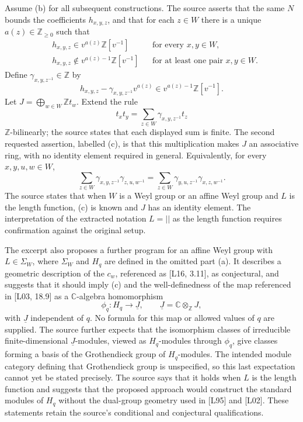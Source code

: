\documentclass[11pt]{article}
\begin{document}
Assume (b) for all subsequent constructions. The source asserts that the same \(N\) bounds the coefficients \(h_{x,y,z}\), and that for each \(z\in W\) there is a unique \(a(z)\in\mathbb Z_{\geq0}\) such that
\[
\begin{aligned}
&h_{x,y,z}\in v^{a(z)}\mathbb Z[v^{-1}]
&&\text{for every }x,y\in W,\\
&h_{x,y,z}\notin v^{a(z)-1}\mathbb Z[v^{-1}]
&&\text{for at least one pair }x,y\in W.
\end{aligned}
\]
Define \(\gamma_{x,y,z^{-1}}\in\mathbb Z\) by
\[
h_{x,y,z}-\gamma_{x,y,z^{-1}}v^{a(z)}
\in v^{a(z)-1}\mathbb Z[v^{-1}].
\]
Let \(J=\bigoplus_{w\in W}\mathbb Zt_w\). Extend the rule
\[
t_xt_y=\sum_{z\in W}\gamma_{x,y,z^{-1}}t_z
\]
\(\mathbb Z\)-bilinearly; the source states that each displayed sum is finite. The second requested assertion, labelled (c), is that this multiplication makes \(J\) an associative ring, with no identity element required in general. Equivalently, for every \(x,y,u,w\in W\),
\[
\sum_{z\in W}\gamma_{x,y,z^{-1}}\gamma_{z,u,w^{-1}}
=
\sum_{z\in W}\gamma_{y,u,z^{-1}}\gamma_{x,z,w^{-1}}.
\tag{c}
\]
The source states that when \(W\) is a Weyl group or an affine Weyl group and \(L\) is the length function, (c) is known and \(J\) has an identity element. The interpretation of the extracted notation \(L=||\) as the length function requires confirmation against the original setup.

The excerpt also proposes a further program for an affine Weyl group with \(L\in\Sigma_W\), where \(\Sigma_W\) and \(H_q\) are defined in the omitted part (a). It describes a geometric description of the \(c_w\), referenced as [L16, 3.11], as conjectural, and suggests that it should imply (c) and the well-definedness of the map referenced in [L03, 18.9] as a \(\mathbb C\)-algebra homomorphism
\[
\phi_q:H_q\longrightarrow\underline J,
\qquad \underline J=\mathbb C\otimes_{\mathbb Z}J,
\]
with \(\underline J\) independent of \(q\). No formula for this map or allowed values of \(q\) are supplied. The source further expects that the isomorphism classes of irreducible finite-dimensional \(\underline J\)-modules, viewed as \(H_q\)-modules through \(\phi_q\), give classes forming a basis of the Grothendieck group of \(H_q\)-modules. The intended module category defining that Grothendieck group is unspecified, so this last expectation cannot yet be stated precisely. The source says that it holds when \(L\) is the length function and suggests that the proposed approach would construct the standard modules of \(H_q\) without the dual-group geometry used in [L95] and [L02]. These statements retain the source's conditional and conjectural qualifications.
\end{document}

